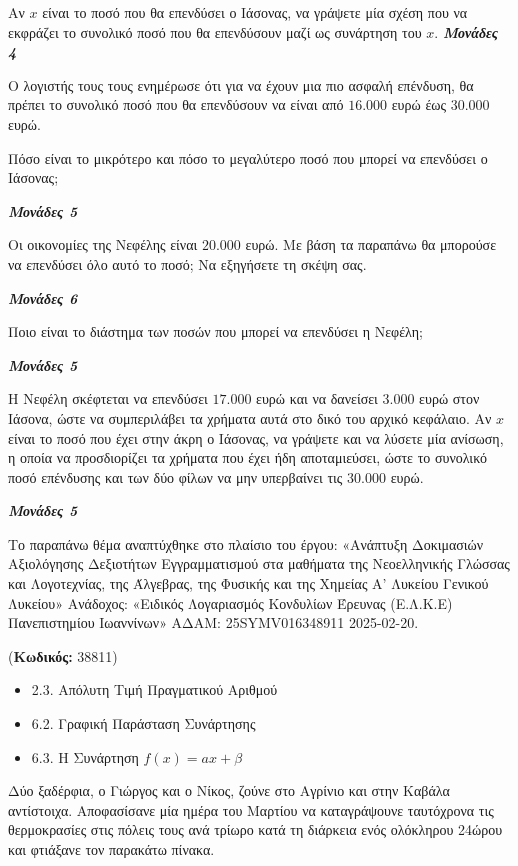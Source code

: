 \documentclass[11pt,a4paper,twoside]{book}
\newcounter{askhsh}[chapter]
\renewcommand{\theaskhsh}{
	\bf{\titlefont{\Large{\thechapter}}.\arabic{askhsh}}
}
\newcommand{\Askhsh}[2]{\refstepcounter{askhsh}{\titlefont{Άσκηση\theaskhsh} - \textcolor{maincolor}{ΘΕΜΑ #2}} ({\small{\textbf{Κωδικός:} #1}})\\}{}
\newenvironment{ylh}{
\begin{tcolorbox}[
breakable,
enhanced standard,
titlerule=0pt,
toprule=0pt, 
rightrule=0pt, 
bottomrule=0pt,
title={\titlefont Ύλη άσκησης},
colback=white,
opacityback=0,
left=2mm,
top=1mm,
bottom=0mm,
boxrule=0pt,
colframe=white,
borderline west={1.5mm}{0pt}{secondarycolor},
leftrule=2mm,
sharp corners,
coltitle=black
]
\begin{itemize}[leftmargin=3mm, itemsep=0mm, label=\textcolor{secondarycolor}{{\small\faBook}}]
}{
\end{itemize}
\end{tcolorbox}
}
\newcommand{\monades}[1]{
\hspace*{\fill}
\textbf{\textit{\textcolor{maincolor}{Μονάδες #1}}}}
\begin{document}
\begin{alist}
\item Αν $x$ είναι το ποσό που θα επενδύσει ο Ιάσονας, να γράψετε μία σχέση που να εκφράζει το συνολικό ποσό που θα επενδύσουν μαζί ως συνάρτηση του $x$.\monades{4}
\item Ο λογιστής τους τους ενημέρωσε ότι για να έχουν μια πιο ασφαλή επένδυση, θα πρέπει το συνολικό ποσό που θα επενδύσουν να είναι από $16.000$ ευρώ έως $30.000$ ευρώ.

\begin{rlist}
\item Πόσο είναι το μικρότερο και πόσο το μεγαλύτερο ποσό που μπορεί να επενδύσει ο Ιάσονας;
\monades{5}
\item Οι οικονομίες της Νεφέλης είναι $20.000$ ευρώ. Με βάση τα παραπάνω θα μπορούσε να επενδύσει όλο αυτό το ποσό; Να εξηγήσετε τη σκέψη σας.
\monades{6}
\item Ποιο είναι το διάστημα των ποσών που μπορεί να επενδύσει η Νεφέλη;
\monades{5}
\end{rlist}
\item Η Νεφέλη σκέφτεται να επενδύσει $17.000$ ευρώ και να δανείσει $3.000$ ευρώ στον Ιάσονα, ώστε να συμπεριλάβει τα χρήματα αυτά στο δικό του αρχικό κεφάλαιο. Αν $x$ είναι το ποσό που έχει στην άκρη ο Ιάσονας, να γράψετε και να λύσετε μία ανίσωση, η οποία να προσδιορίζει τα χρήματα που έχει ήδη αποταμιεύσει, ώστε το συνολικό ποσό επένδυσης και των δύο φίλων να μην υπερβαίνει τις $30.000$ ευρώ.
\monades{5}

{\footnotesize Το παραπάνω θέμα αναπτύχθηκε στο πλαίσιο του έργου: «Ανάπτυξη Δοκιμασιών Αξιολόγησης Δεξιοτήτων Εγγραμματισμού στα μαθήματα της Νεοελληνικής Γλώσσας και Λογοτεχνίας, της Άλγεβρας, της Φυσικής και της Χημείας Α' Λυκείου Γενικού Λυκείου» Ανάδοχος: «Ειδικός Λογαριασμός Κονδυλίων Έρευνας (Ε.Λ.Κ.Ε) Πανεπιστημίου Ιωαννίνων» ΑΔΑΜ: 25SYMV016348911 2025-02-20.}
\end{alist}

\vspace{4mm}
\Askhsh{38811}{4}
\begin{ylh}
    \item 2.3. Απόλυτη Τιμή Πραγματικού Αριθμού
    \item 6.2. Γραφική Παράσταση Συνάρτησης
    \item 6.3. Η Συνάρτηση $f(x)=ax+\beta$
\end{ylh}

Δύο ξαδέρφια, ο Γιώργος και ο Νίκος, ζούνε στο Αγρίνιο και στην Καβάλα αντίστοιχα. Αποφασίσανε μία ημέρα του Μαρτίου να καταγράψουνε ταυτόχρονα τις θερμοκρασίες στις πόλεις τους ανά τρίωρο κατά τη διάρκεια ενός ολόκληρου 24ώρου και φτιάξανε τον παρακάτω πίνακα.
\end{document}

